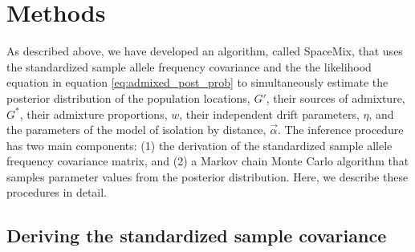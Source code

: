 \documentclass[12pt]{article}
\newcommand{\identifyadmixsource}[1]{{#1^{*}}}
\begin{document}
\section*{Methods}
As described above, we have developed an algorithm, called SpaceMix, that uses the standardized sample allele frequency covariance and the the likelihood equation in equation \eqref{eq:admixed_post_prob} to simultaneously estimate the posterior distribution of the population locations, $G'$, their sources of admixture, $\identifyadmixsource{G}$, their admixture proportions, $w$, their independent drift parameters, $\eta$, and the parameters of the model of isolation by distance, $\vec{\alpha}$.  The inference procedure has two main components: (1) the derivation of the standardized sample allele frequency covariance matrix, and (2) a Markov chain Monte Carlo algorithm that samples parameter values from the posterior distribution.  Here, we describe these procedures in detail.

\subsection*{Deriving the standardized sample covariance}
\end{document}
